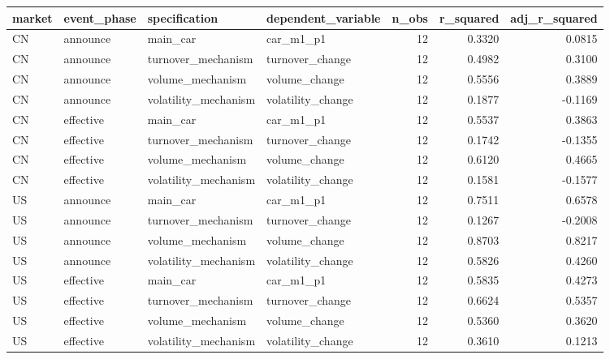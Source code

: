 \begin{tabular}{llllrrr}
\toprule
market & event_phase & specification & dependent_variable & n_obs & r_squared & adj_r_squared \\
\midrule
CN & announce & main_car & car_m1_p1 & 12 & 0.3320 & 0.0815 \\
CN & announce & turnover_mechanism & turnover_change & 12 & 0.4982 & 0.3100 \\
CN & announce & volume_mechanism & volume_change & 12 & 0.5556 & 0.3889 \\
CN & announce & volatility_mechanism & volatility_change & 12 & 0.1877 & -0.1169 \\
CN & effective & main_car & car_m1_p1 & 12 & 0.5537 & 0.3863 \\
CN & effective & turnover_mechanism & turnover_change & 12 & 0.1742 & -0.1355 \\
CN & effective & volume_mechanism & volume_change & 12 & 0.6120 & 0.4665 \\
CN & effective & volatility_mechanism & volatility_change & 12 & 0.1581 & -0.1577 \\
US & announce & main_car & car_m1_p1 & 12 & 0.7511 & 0.6578 \\
US & announce & turnover_mechanism & turnover_change & 12 & 0.1267 & -0.2008 \\
US & announce & volume_mechanism & volume_change & 12 & 0.8703 & 0.8217 \\
US & announce & volatility_mechanism & volatility_change & 12 & 0.5826 & 0.4260 \\
US & effective & main_car & car_m1_p1 & 12 & 0.5835 & 0.4273 \\
US & effective & turnover_mechanism & turnover_change & 12 & 0.6624 & 0.5357 \\
US & effective & volume_mechanism & volume_change & 12 & 0.5360 & 0.3620 \\
US & effective & volatility_mechanism & volatility_change & 12 & 0.3610 & 0.1213 \\
\bottomrule
\end{tabular}
